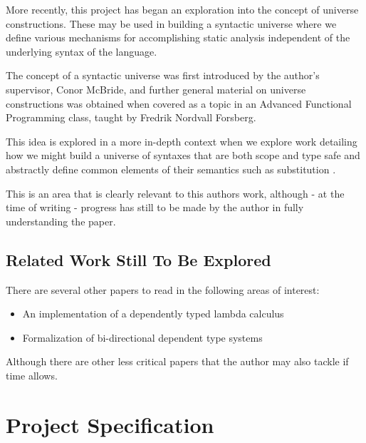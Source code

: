 \documentclass{ProgressReport}[2020/09/15]
\begin{document}
          More recently, this project has began an exploration into the concept of
          universe constructions. These may be used in building a syntactic universe
          where we define various mechanisms for accomplishing
          static analysis independent of the underlying syntax of the
          language.

          The concept of a syntactic universe was first introduced by
          the author's supervisor, Conor McBride, and further general
          material on universe constructions was obtained when covered
          as a topic in an Advanced Functional Programming class, taught
          by Fredrik Nordvall Forsberg.

          This idea is explored in a more in-depth context when we
          explore work detailing how we might build a universe of
          syntaxes that are both scope and type safe and abstractly
          define common elements of their semantics such as
          substitution \cite{DBLP:journals/corr/abs-2001-11001}.

          This is an area that is clearly relevant to this authors
          work, although - at the time of writing - progress has still
          to be made by the author in fully understanding the paper.

          \section{Related Work Still To Be Explored}

          There are several other papers to read in the following
          areas of interest:

          \begin{itemize}
          \item An implementation of a dependently typed lambda
            calculus \cite{ATutorialImplementationOfDTLC}
          \item Formalization of bi-directional dependent type systems \cite{TypesWhoSayNi}
          \end{itemize}

          Although there are other less critical papers that the
          author may also tackle if time allows.
       
        \chapter{Project Specification}
\end{document}
